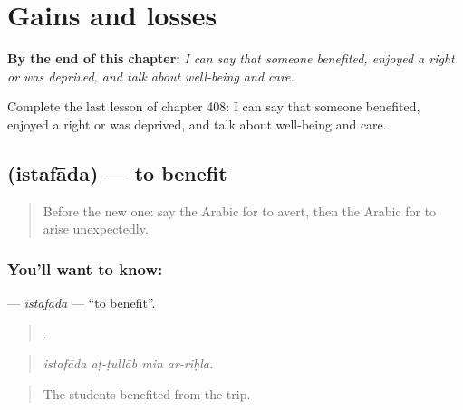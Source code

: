 
\chapter{Gains and losses}
\label{ch:ar-gains-and-losses}

\begin{chapteropening}
\textbf{By the end of this chapter:} \emph{I can say that someone benefited, enjoyed a right or was deprived, and talk about well-being and care.}

Complete the last lesson of chapter 408: I can say that someone benefited, enjoyed a right or was deprived, and talk about well-being and care.
\end{chapteropening}

\section[\texorpdfstring{\ar{استفاد} (istafāda)}{استفاد (istafāda)}]{ (istafāda) — to benefit}

\label{lesson:AR-C408-istafada}



\begin{quote}
Before the new one: say the Arabic for to avert, then the Arabic for to arise unexpectedly.
\end{quote}

\subsection*{You'll want to know: }
\textbf{} — \emph{istafāda} — \textquotedblleft{}to benefit\textquotedblright{}.

\begin{quote}
   .
\end{quote}

\begin{quote}
\emph{istafāda aṭ-ṭullāb min ar-riḥla.}
\end{quote}

\begin{quote}
The students benefited from the trip.
\end{quote}


